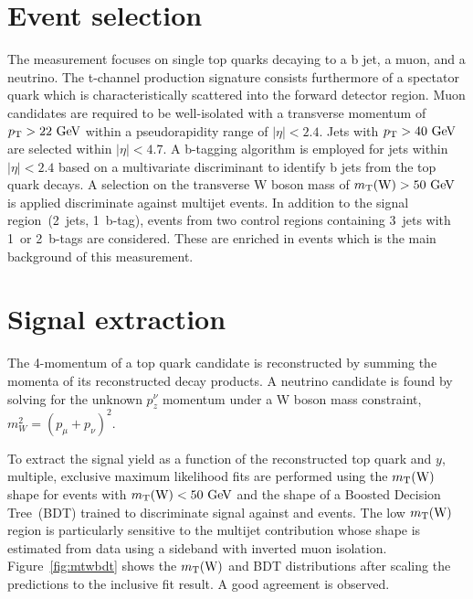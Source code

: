 \documentclass[12pt]{article}
\begin{document}
\section{Event selection}

The measurement focuses on single top quarks decaying to a b jet, a muon, and a neutrino. The t-channel production signature consists furthermore of a spectator quark which is characteristically scattered into the forward detector region. Muon candidates are required to be well-isolated with a transverse momentum of $p_\mathrm{T}>22~\mathrm{GeV}$ within a pseudorapidity range of $|\eta|<2.4$. Jets with $p_\mathrm{T}>40~\mathrm{GeV}$ are selected within $|\eta|<4.7$. A b-tagging algorithm is employed for jets within $|\eta|<2.4$ based on a multivariate discriminant to identify b jets from the top quark decays. A selection on the transverse W boson mass of $m_{\mathrm{T}}(\mathrm{W})>50~\mathrm{GeV}$ is applied discriminate against multijet events. In addition to the signal region~(2~jets, 1~b-tag), events from two control regions containing 3~jets with 1~or 2~b-tags are considered. These are enriched in \ttbar events which is the main background of this measurement.


\section{Signal extraction}

The 4-momentum of a top quark candidate is reconstructed by summing the momenta of its reconstructed decay products. A neutrino candidate is found by solving for the unknown $p_{z}^{\nu}$ momentum under a W boson mass constraint, $m_{W}^{2}=(p_{\mu}+p_{\nu})^{2}$.

To extract the signal yield as a function of the reconstructed top quark \pt and $y$, multiple, exclusive maximum likelihood fits are performed using the $m_{\mathrm{T}}(\mathrm{W})$ shape for events with $m_{\mathrm{T}}(\mathrm{W})<50~\mathrm{GeV}$ and the shape of a Boosted Decision Tree~(BDT) trained to discriminate signal against \ttbar and \wjets events. The low $m_{\mathrm{T}}(\mathrm{W})$ region is particularly sensitive to the multijet contribution whose shape is estimated from data using a sideband with inverted muon isolation. Figure~\ref{fig:mtwbdt} shows the $m_{\mathrm{T}}(\mathrm{W})$ and BDT distributions after scaling the predictions to the inclusive fit result. A good agreement is observed.
\end{document}
